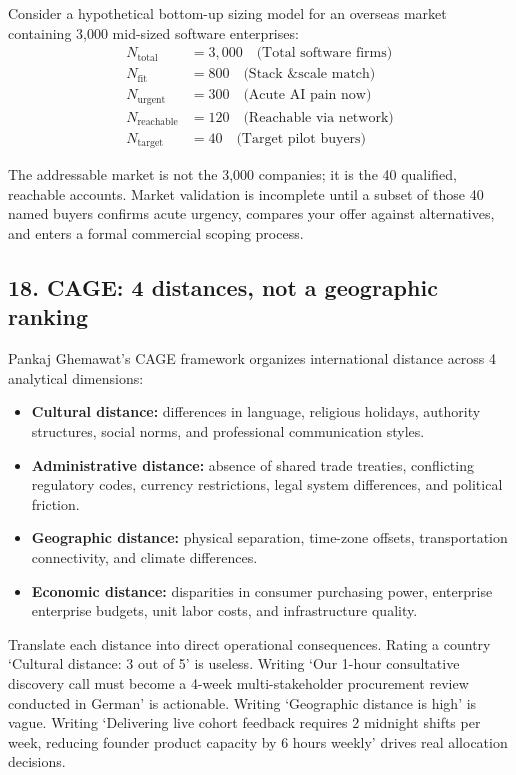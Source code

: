 Consider a hypothetical bottom-up sizing model for an overseas market containing 3,000 mid-sized software enterprises:
\begin{align}
N_{\text{total}} &= 3,000 \quad \text{(Total software firms)} \nonumber\\
N_{\text{fit}} &= 800 \quad \text{(Stack \& scale match)} \nonumber\\
N_{\text{urgent}} &= 300 \quad \text{(Acute AI pain now)} \nonumber\\
N_{\text{reachable}} &= 120 \quad \text{(Reachable via network)} \nonumber\\
N_{\text{target}} &= 40 \quad \text{(Target pilot buyers)}
\end{align}

The addressable market is not the 3,000 companies; it is the 40 qualified, reachable accounts. Market validation is incomplete until a subset of those 40 named buyers confirms acute urgency, compares your offer against alternatives, and enters a formal commercial scoping process.

\subsection{18. CAGE: 4 distances, not a geographic ranking}

Pankaj Ghemawat's CAGE framework organizes international distance across 4 analytical dimensions:
\begin{itemize}
    \item \textbf{Cultural distance:} differences in language, religious holidays, authority structures, social norms, and professional communication styles.
    \item \textbf{Administrative distance:} absence of shared trade treaties, conflicting regulatory codes, currency restrictions, legal system differences, and political friction.
    \item \textbf{Geographic distance:} physical separation, time-zone offsets, transportation connectivity, and climate differences.
    \item \textbf{Economic distance:} disparities in consumer purchasing power, enterprise enterprise budgets, unit labor costs, and infrastructure quality.
\end{itemize}

Translate each distance into direct operational consequences. Rating a country `Cultural distance: 3 out of 5' is useless. Writing `Our 1-hour consultative discovery call must become a 4-week multi-stakeholder procurement review conducted in German' is actionable. Writing `Geographic distance is high' is vague. Writing `Delivering live cohort feedback requires 2 midnight shifts per week, reducing founder product capacity by 6 hours weekly' drives real allocation decisions.

